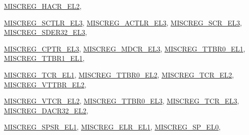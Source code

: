 \begin{DoxyCompactItemize}
\hyperlink{namespaceArmISA_a1e522017e015d4c7efd6b2360143aa67a43ce3b6a140627e458b36eca93457ace}{MISCREG\_\-HACR\_\-EL2}, 
\par
\hyperlink{namespaceArmISA_a1e522017e015d4c7efd6b2360143aa67ada649d9bf9edebc6d6987cd11e43312c}{MISCREG\_\-SCTLR\_\-EL3}, 
\hyperlink{namespaceArmISA_a1e522017e015d4c7efd6b2360143aa67a4f3a1c57436411add680618e64bdda2f}{MISCREG\_\-ACTLR\_\-EL3}, 
\hyperlink{namespaceArmISA_a1e522017e015d4c7efd6b2360143aa67a959fccb90767dd79eb8a7240b84aceae}{MISCREG\_\-SCR\_\-EL3}, 
\hyperlink{namespaceArmISA_a1e522017e015d4c7efd6b2360143aa67ad65983ac8e2afa65f033ed722960415e}{MISCREG\_\-SDER32\_\-EL3}, 
\par
\hyperlink{namespaceArmISA_a1e522017e015d4c7efd6b2360143aa67a6493a7eae76b48dc0761271b223e9e2c}{MISCREG\_\-CPTR\_\-EL3}, 
\hyperlink{namespaceArmISA_a1e522017e015d4c7efd6b2360143aa67afab9ad1886307cd89200dba6abad4817}{MISCREG\_\-MDCR\_\-EL3}, 
\hyperlink{namespaceArmISA_a1e522017e015d4c7efd6b2360143aa67ab061e5a58c89419b5e5e4044bac12532}{MISCREG\_\-TTBR0\_\-EL1}, 
\hyperlink{namespaceArmISA_a1e522017e015d4c7efd6b2360143aa67ab1e490523d083a21f2b740b450a650d6}{MISCREG\_\-TTBR1\_\-EL1}, 
\par
\hyperlink{namespaceArmISA_a1e522017e015d4c7efd6b2360143aa67aeab19dfbe4749ed1d0ef5e502fcdece3}{MISCREG\_\-TCR\_\-EL1}, 
\hyperlink{namespaceArmISA_a1e522017e015d4c7efd6b2360143aa67ae3fc24762c807b79f9e589bd63d51ca0}{MISCREG\_\-TTBR0\_\-EL2}, 
\hyperlink{namespaceArmISA_a1e522017e015d4c7efd6b2360143aa67a5fadadb14cafd82fdbb1e6a06a96876a}{MISCREG\_\-TCR\_\-EL2}, 
\hyperlink{namespaceArmISA_a1e522017e015d4c7efd6b2360143aa67a600a8174238e0bd45fe0d621da0e6afd}{MISCREG\_\-VTTBR\_\-EL2}, 
\par
\hyperlink{namespaceArmISA_a1e522017e015d4c7efd6b2360143aa67acbb4054f34ecd0e78fd051549973ffd1}{MISCREG\_\-VTCR\_\-EL2}, 
\hyperlink{namespaceArmISA_a1e522017e015d4c7efd6b2360143aa67a9c90551c1a59c5948b3c7bb51ba3126f}{MISCREG\_\-TTBR0\_\-EL3}, 
\hyperlink{namespaceArmISA_a1e522017e015d4c7efd6b2360143aa67a2f6ba1cbb6b8d7df1e2cad05d59605d4}{MISCREG\_\-TCR\_\-EL3}, 
\hyperlink{namespaceArmISA_a1e522017e015d4c7efd6b2360143aa67ac789cea35d8b88a54c67d15aefdf4654}{MISCREG\_\-DACR32\_\-EL2}, 
\par
\hyperlink{namespaceArmISA_a1e522017e015d4c7efd6b2360143aa67aec90062368ecc0dbf38ce1e92c941ab3}{MISCREG\_\-SPSR\_\-EL1}, 
\hyperlink{namespaceArmISA_a1e522017e015d4c7efd6b2360143aa67a9df018f5b8eee46fea474561c278b8a9}{MISCREG\_\-ELR\_\-EL1}, 
\hyperlink{namespaceArmISA_a1e522017e015d4c7efd6b2360143aa67ac974a2c347ed803c70e3e3290e689fe7}{MISCREG\_\-SP\_\-EL0}, 

\end{DoxyCompactItemize}
